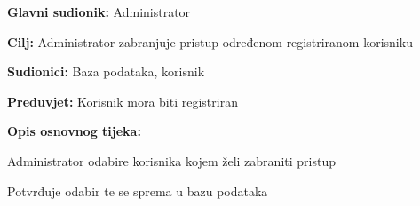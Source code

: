 				\noindent {}
				\begin{packed_item}
					
					\item \textbf{Glavni sudionik: }Administrator
					\item  \textbf{Cilj:} Administrator zabranjuje pristup određenom registriranom korisniku
					\item  \textbf{Sudionici:} Baza podataka, korisnik
					\item  \textbf{Preduvjet:} Korisnik mora biti registriran
					\item  \textbf{Opis osnovnog tijeka:}
					
					\item[] \begin{packed_enum}
						
						\item Administrator odabire korisnika kojem želi zabraniti pristup
						\item Potvrđuje odabir te se sprema u bazu podataka
					\end{packed_enum}
				\end{packed_item}


